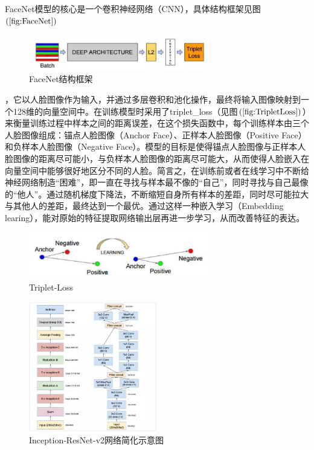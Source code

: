 \documentclass[UTF8]{ctexart}
\begin{document}
FaceNet模型的核心是一个卷积神经网络（CNN），具体结构框架见图$\left(\ref{fig:FaceNet}\right)$
\begin{figure}[!ht]
    \centering
    \includegraphics[width=0.7\textwidth]{FaceNet.png}
    \caption{FaceNet结构框架}
    \label{fig:FaceNet}
\end{figure}
，它以人脸图像作为输入，并通过多层卷积和池化操作，最终将输入图像映射到一个128维的向量空间中。在训练模型时采用了triplet\_loss（见图$\left(\ref{fig:TripletLoss}\right)$）来衡量训练过程中样本之间的距离误差，在这个损失函数中，每个训练样本由三个人脸图像组成：锚点人脸图像（Anchor Face）、正样本人脸图像（Positive Face）和负样本人脸图像（Negative Face）。模型的目标是使得锚点人脸图像与正样本人脸图像的距离尽可能小，与负样本人脸图像的距离尽可能大，从而使得人脸嵌入在向量空间中能够很好地区分不同的人脸。简言之，在训练前或者在线学习中不断给神经网络制造“困难”，即一直在寻找与样本最不像的“自己”，同时寻找与自己最像的“他人”。通过随机梯度下降法，不断缩短自身所有样本的差距，同时尽可能拉大与其他人的差距，最终达到一个最优。通过这样一种嵌入学习（Embedding learing），能对原始的特征提取网络输出层再进一步学习，从而改善特征的表达。
\begin{figure}[!ht]
    \centering
    \includegraphics[width=0.7\textwidth]{TripletLoss.png}
    \caption{Triplet-Loss}
    \label{fig:TripletLoss}
\end{figure}

\begin{figure}[!ht]
    \centering
    \includegraphics[width=0.5\textwidth]{InceptionResNetv2.jpg}
    \caption{Inception-ResNet-v2网络简化示意图}
    \label{fig:InceptionResNetv2}
\end{figure}
\end{document}
